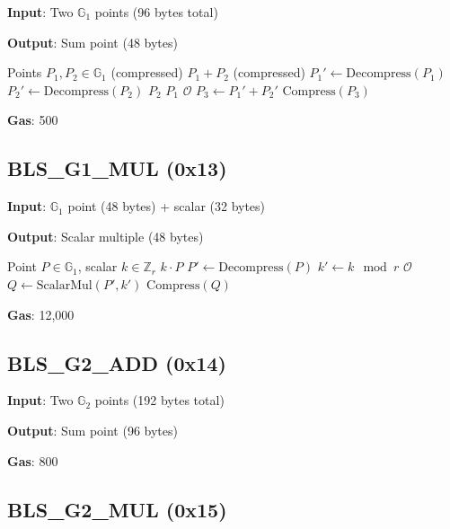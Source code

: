 \documentclass[11pt,a4paper]{article}
\theoremstyle{definition}
\begin{document}
\textbf{Input}: Two $\mathbb{G}_1$ points (96 bytes total)

\textbf{Output}: Sum point (48 bytes)

\begin{algorithm}
\caption{G1 Point Addition}
\begin{algorithmic}[1]
\Require Points $P_1, P_2 \in \mathbb{G}_1$ (compressed)
\Ensure $P_1 + P_2$ (compressed)
\State $P_1' \gets \text{Decompress}(P_1)$
\State $P_2' \gets \text{Decompress}(P_2)$
 \Return $P_2$
 \Return $P_1$
 \Return $\mathcal{O}$
\Else
    \State $P_3 \gets P_1' + P_2'$ 
    \Return $\text{Compress}(P_3)$
\EndIf
\end{algorithmic}
\end{algorithm}

\textbf{Gas}: 500

\subsection{BLS\_G1\_MUL (0x13)}

\textbf{Input}: $\mathbb{G}_1$ point (48 bytes) + scalar (32 bytes)

\textbf{Output}: Scalar multiple (48 bytes)

\begin{algorithm}
\caption{G1 Scalar Multiplication}
\begin{algorithmic}[1]
\Require Point $P \in \mathbb{G}_1$, scalar $k \in \mathbb{Z}_r$
\Ensure $k \cdot P$
\State $P' \gets \text{Decompress}(P)$
\State $k' \gets k \mod r$
 \Return $\mathcal{O}$
\EndIf
\State $Q \gets \text{ScalarMul}(P', k')$ 
\Return $\text{Compress}(Q)$
\end{algorithmic}
\end{algorithm}

\textbf{Gas}: 12,000

\subsection{BLS\_G2\_ADD (0x14)}

\textbf{Input}: Two $\mathbb{G}_2$ points (192 bytes total)

\textbf{Output}: Sum point (96 bytes)

\textbf{Gas}: 800

\subsection{BLS\_G2\_MUL (0x15)}
\end{document}
